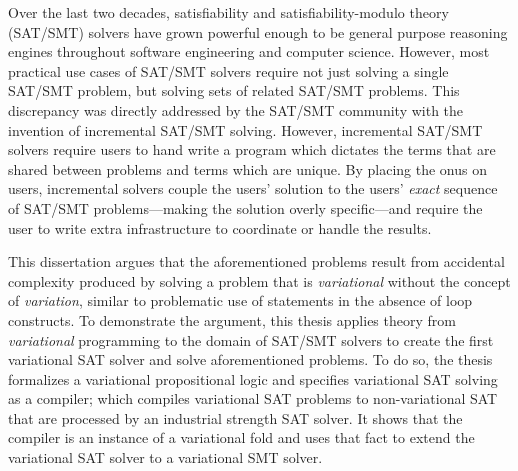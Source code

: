 Over the last two decades, satisfiability and satisfiability-modulo theory
(SAT/SMT) solvers have grown powerful enough to be general purpose reasoning
engines throughout software engineering and computer science. However, most
practical use cases of SAT/SMT solvers require not just solving a single SAT/SMT
problem, but solving sets of related SAT/SMT problems. This discrepancy was
directly addressed by the SAT/SMT community with the invention of incremental
SAT/SMT solving. However, incremental SAT/SMT solvers require users to hand
write a program which dictates the terms that are shared between problems and
terms which are unique. By placing the onus on users, incremental solvers
couple the users' solution to the users' \emph{exact} sequence of
SAT/SMT problems---making the solution overly specific---and require the
user to write extra infrastructure to coordinate or handle the results.

This dissertation argues that the aforementioned problems result from accidental
complexity produced by solving a problem that is \emph{variational} without the
concept of \emph{variation}, similar to problematic use of  statements
in the absence of  loop constructs. To demonstrate the argument, this
thesis applies theory from \emph{variational} programming to the domain of
SAT/SMT solvers to create the first variational SAT solver and solve
aforementioned problems.
%
To do so, the thesis formalizes a variational propositional logic and specifies
variational SAT solving as a compiler; which compiles variational SAT problems
to non-variational SAT that are processed by an industrial strength SAT solver.
It shows that the compiler is an instance of a variational fold and uses that
fact to extend the variational SAT solver to a variational SMT solver.


